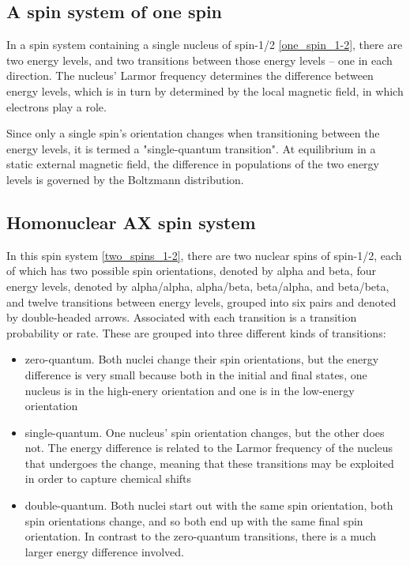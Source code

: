 \subsection*{A spin system of one spin}

In a spin system containing a single nucleus of spin-1/2 \ref{one_spin_1-2},
there are two energy levels, and two transitions between those energy levels
-- one in each direction.  The nucleus' Larmor frequency determines the 
difference between energy levels, which is in turn by determined by the 
local magnetic field, in which electrons play a role.

Since only a single spin's orientation changes when transitioning between
the energy levels, it is termed a "single-quantum transition".
At equilibrium in a static external magnetic field, the difference in 
populations of the two energy levels is governed by the Boltzmann distribution.


\subsection*{Homonuclear AX spin system}

In this spin system \ref{two_spins_1-2}, there are
two nuclear spins of spin-1/2, each of which has two possible spin orientations,
denoted by alpha and beta,
four energy levels, denoted by alpha/alpha, alpha/beta, beta/alpha, and beta/beta, and
twelve transitions between energy levels, grouped into six pairs and denoted
by double-headed arrows.  Associated with each transition is a transition
probability or rate.  These are grouped into three different kinds of transitions:

\begin{itemize} 
  \item zero-quantum.  Both nuclei change their spin orientations, 
     but the energy difference is very small because both in the initial and
     final states, one nucleus is in the high-enery orientation and one is in
     the low-energy orientation

  \item single-quantum.  One nucleus' spin orientation changes, but
     the other does not.  The energy difference is related to the Larmor frequency
     of the nucleus that undergoes the change, meaning that these transitions may
     be exploited in order to capture chemical shifts

  \item double-quantum.  Both nuclei start out with the same spin
     orientation, both spin orientations change, and so both end up with the
     same final spin orientation.  In contrast to the zero-quantum transitions,
     there is a much larger energy difference involved.

\end{itemize}
   
